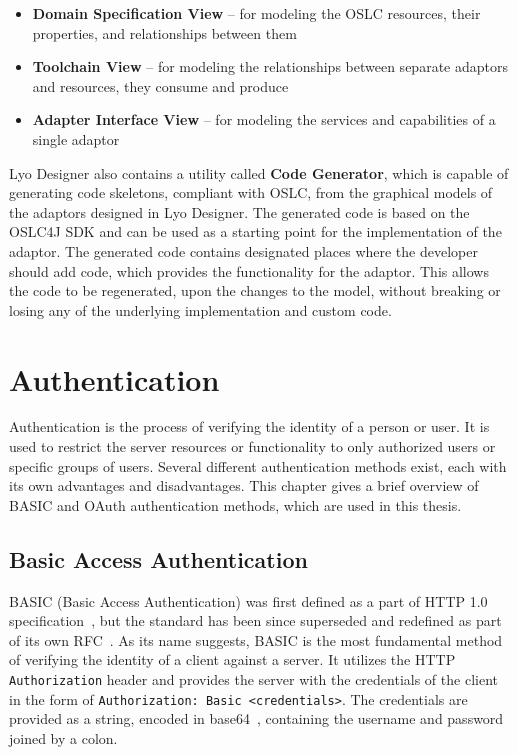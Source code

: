 \begin{itemize}
  \item \textbf{Domain Specification View} -- for modeling the OSLC resources, their properties, and relationships between them
  \item \textbf{Toolchain View} -- for modeling the relationships between separate adaptors and resources, they consume and produce
  \item \textbf{Adapter Interface View} -- for modeling the services and capabilities of a single adaptor
\end{itemize}

Lyo Designer also contains a utility called \textbf{Code Generator}, which is capable of generating code skeletons, compliant with OSLC, from the graphical models of the adaptors designed in Lyo Designer. The generated code is based on the OSLC4J SDK and can be used as a starting point for the implementation of the adaptor. The generated code contains designated places where the developer should add code, which provides the functionality for the adaptor. This allows the code to be regenerated, upon the changes to the model, without breaking or losing any of the underlying implementation and custom code.


\chapter{Authentication}
\label{chapter:authentication}
Authentication is the process of verifying the identity of a person or user. It is used to restrict the server resources or functionality to only authorized users or specific groups of users. Several different authentication methods exist, each with its own advantages and disadvantages. This chapter gives a brief overview of BASIC and OAuth authentication methods, which are used in this thesis.

\section{Basic Access Authentication}
BASIC (Basic Access Authentication) was first defined as a part of HTTP 1.0 specification \cite{http1.0_w3}, but the standard has been since superseded and redefined as part of its own RFC \cite{basic_auth_rfc}. As its name suggests, BASIC is the most fundamental method of verifying the identity of a client against a server. It utilizes the HTTP \texttt{Authorization} header and provides the server with the credentials of the client in the form of \texttt{Authorization: Basic <credentials>}. The credentials are provided as a string, encoded in base64 \cite{base64_rfc}, containing the username and password joined by a colon.

